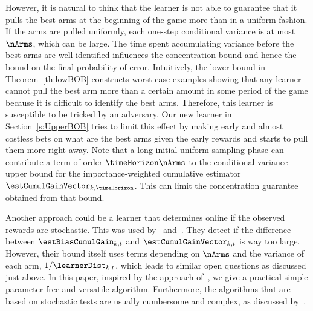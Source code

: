However, it is natural to 
think that the learner is not able to guarantee that it pulls 
the best arms at the beginning of the game more than in a 
uniform fashion.
If the arms are pulled uniformly, each one-step conditional variance is
at most $\nArms$, which can be large.
The time spent accumulating variance before the best arms are well identified influences the concentration bound and hence the bound on the final probability of error. 
Intuitively, the lower bound in Theorem~\ref{th:lowBOB} 
constructs worst-case examples 
showing that any learner cannot pull the best arm more than 
a certain amount in some period of the game because it is difficult to identify the best arms. 
Therefore, 
this learner is susceptible to be tricked by an adversary. Our new learner
in Section~\ref{s:UpperBOB} tries to limit this effect by 
making early and almost costless bets on what are the 
best arms given the early rewards and starts to pull them more right away.
Note that a long initial uniform sampling phase can contribute a term
of order $\timeHorizon\nArms$ to the conditional-variance upper bound for
the importance-weighted cumulative estimator $\estCumulGainVector_{k,\timeHorizon}$.
This can limit the concentration guarantee obtained from that bound.

Another approach could be a learner that determines online 
if the observed rewards are stochastic. This was used by~\cite{Bubeck12BB} and~\cite{Auer16AA}. They 
detect if the difference between $\estBiasCumulGain_{k,t}$
and $\estCumulGainVector_{k,t}$
is way too large. However, their bound itself uses  terms 
depending
on $\nArms$ and the variance of each arm, 
$1/\learnerDist_{k,t}$, which leads to similar open questions 
as discussed just above. In this paper, inspired by the approach 
of~\cite{Seldin14OP},  we give a practical 
simple parameter-free and versatile algorithm.  Furthermore,  the algorithms
that are based on stochastic tests are usually cumbersome and complex,  as discussed by~\citealp{Seldin14OP}.
